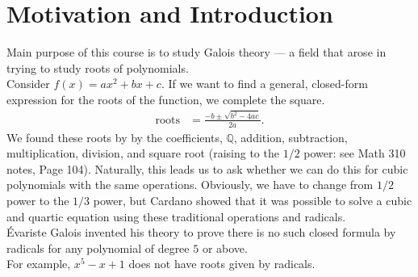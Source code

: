 \documentclass[10pt]{extarticle}
\title{}
\author{}
\date{}
\newcommand{\Q}{\mathbb{Q}}
\begin{document}
  \section{Motivation and Introduction}%
  Main purpose of this course is to study Galois theory --- a field that arose in trying to study roots of polynomials.\\

  Consider $f(x) = ax^2 + bx + c$. If we want to find a general, closed-form expression for the roots of the function, we complete the square.
  \begin{align*}
    \text{roots} &= \frac{-b \pm \sqrt{b^2-4ac}}{2a}.
  \end{align*}
  We found these roots by by the coefficients, $\Q$, addition, subtraction, multiplication, division, and square root (raising to the $1/2$ power: see Math 310 notes, Page 104). Naturally, this leads us to ask whether we can do this for cubic polynomials with the same operations. Obviously, we have to change from $1/2$ power to the $1/3$ power, but Cardano showed that it was possible to solve a cubic and quartic equation using these traditional operations and radicals.\\

  Évariste Galois invented his theory to prove there is no such closed formula by radicals for any polynomial of degree $5$ or above.\\

  For example, $x^5 - x + 1$ does not have roots given by radicals.
\end{document}
